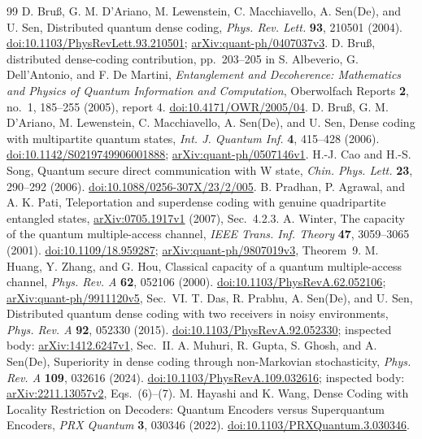 \documentclass[11pt]{article}
\begin{document}
\begin{thebibliography}{99}
D. Bru\ss, G. M. D'Ariano, M. Lewenstein, C. Macchiavello, A. Sen(De), and U. Sen,
Distributed quantum dense coding, \emph{Phys. Rev. Lett.} \textbf{93}, 210501 (2004).
\href{https://doi.org/10.1103/PhysRevLett.93.210501}{doi:10.1103/PhysRevLett.93.210501};
\href{https://arxiv.org/abs/quant-ph/0407037v3}{arXiv:quant-ph/0407037v3}.
D. Bru\ss, distributed dense-coding contribution, pp.~203--205 in
S. Albeverio, G. Dell'Antonio, and F. De Martini,
\emph{Entanglement and Decoherence: Mathematics and Physics of Quantum
Information and Computation}, Oberwolfach Reports \textbf{2}, no.~1,
185--255 (2005), report 4.
\href{https://doi.org/10.4171/OWR/2005/04}{doi:10.4171/OWR/2005/04}.
D. Bru\ss, G. M. D'Ariano, M. Lewenstein, C. Macchiavello, A. Sen(De), and U. Sen,
Dense coding with multipartite quantum states,
\emph{Int. J. Quantum Inf.} \textbf{4}, 415--428 (2006).
\href{https://doi.org/10.1142/S0219749906001888}{doi:10.1142/S0219749906001888};
\href{https://arxiv.org/abs/quant-ph/0507146v1}{arXiv:quant-ph/0507146v1}.
H.-J. Cao and H.-S. Song, Quantum secure direct communication with W state,
\emph{Chin. Phys. Lett.} \textbf{23}, 290--292 (2006).
\href{https://doi.org/10.1088/0256-307X/23/2/005}{doi:10.1088/0256-307X/23/2/005}.
B. Pradhan, P. Agrawal, and A. K. Pati,
Teleportation and superdense coding with genuine quadripartite entangled states,
\href{https://arxiv.org/abs/0705.1917v1}{arXiv:0705.1917v1} (2007), Sec.~4.2.3.
A. Winter, The capacity of the quantum multiple-access channel,
\emph{IEEE Trans. Inf. Theory} \textbf{47}, 3059--3065 (2001).
\href{https://doi.org/10.1109/18.959287}{doi:10.1109/18.959287};
\href{https://arxiv.org/abs/quant-ph/9807019v3}{arXiv:quant-ph/9807019v3}, Theorem~9.
M. Huang, Y. Zhang, and G. Hou,
Classical capacity of a quantum multiple-access channel,
\emph{Phys. Rev. A} \textbf{62}, 052106 (2000).
\href{https://doi.org/10.1103/PhysRevA.62.052106}{doi:10.1103/PhysRevA.62.052106};
\href{https://arxiv.org/abs/quant-ph/9911120v5}{arXiv:quant-ph/9911120v5}, Sec.~VI.
T. Das, R. Prabhu, A. Sen(De), and U. Sen,
Distributed quantum dense coding with two receivers in noisy environments,
\emph{Phys. Rev. A} \textbf{92}, 052330 (2015).
\href{https://doi.org/10.1103/PhysRevA.92.052330}{doi:10.1103/PhysRevA.92.052330};
inspected body: \href{https://arxiv.org/abs/1412.6247v1}{arXiv:1412.6247v1}, Sec.~II.
A. Muhuri, R. Gupta, S. Ghosh, and A. Sen(De),
Superiority in dense coding through non-Markovian stochasticity,
\emph{Phys. Rev. A} \textbf{109}, 032616 (2024).
\href{https://doi.org/10.1103/PhysRevA.109.032616}{doi:10.1103/PhysRevA.109.032616};
inspected body: \href{https://arxiv.org/abs/2211.13057v2}{arXiv:2211.13057v2}, Eqs.~(6)--(7).
M. Hayashi and K. Wang, Dense Coding with Locality Restriction on Decoders:
Quantum Encoders versus Superquantum Encoders,
\emph{PRX Quantum} \textbf{3}, 030346 (2022).
\href{https://doi.org/10.1103/PRXQuantum.3.030346}{doi:10.1103/PRXQuantum.3.030346}.
\end{thebibliography}
\end{document}
